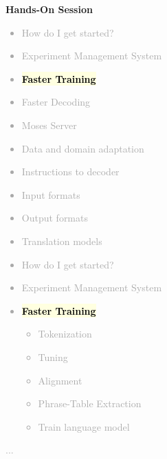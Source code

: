 \documentclass[landscape]{uedslides2C}
\newcommand{\currenttopic}[1]{\colorbox{lightyellow}{\textcolor{black}{\bf #1}}}
\begin{document}
\slide{}
\vspace{50mm}
\begin{center}
\Huge \bf Hands-On Session
\end{center}


\vspace{-5mm}
\textcolor{darkgrey}{
\begin{itemize} \itemsep -1mm
\item {How do I get started?}
\item {Experiment Management System}
\item \currenttopic{Faster Training}
\item {Faster Decoding}
\item {Moses Server}
\item {Data and domain adaptation}
\item {Instructions to decoder}
\item {Input formats}
\item {Output formats}
\item {Translation models}
\end{itemize}
}


\vspace{-5mm}
\textcolor{darkgrey}{
\begin{itemize} \itemsep -1mm
\item {How do I get started?}
\item {Experiment Management System}
\item \currenttopic{Faster Training}
  \begin{itemize}
  \item Tokenization
  \item Tuning
  \item Alignment
  \item Phrase-Table Extraction
  \item Train language model
  \end{itemize}
\end{itemize}
...
}


\end{document}
